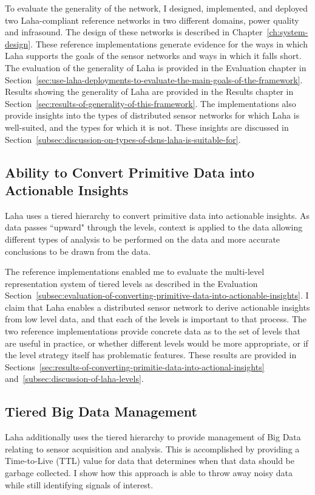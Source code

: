 To evaluate the generality of the network, I designed, implemented, and deployed two Laha-compliant reference networks in two different domains, power quality and infrasound. The design of these networks is described in Chapter~\ref{ch:system-design}. These reference implementations generate evidence for the ways in which Laha supports the goals of the sensor networks and ways in which it falls short. The evaluation of the generality of Laha is provided in the Evaluation chapter in Section~\ref{sec:use-laha-deployments-to-evaluate-the-main-goals-of-the-framework}. Results showing the generality of Laha are provided in the Results chapter in Section~\ref{sec:results-of-generality-of-this-framework}. The implementations also provide insights into the types of distributed sensor networks for which Laha is well-suited, and the types for which it is not. These insights are discussed in Section~\ref{subsec:discussion-on-types-of-dsns-laha-is-suitable-for}.

\subsection{Ability to Convert Primitive Data into Actionable Insights}\label{subsec:ability-to-convert-primitive-data-into-actional-insights}
Laha uses a tiered hierarchy to convert primitive data into actionable insights. As data passes ``upward" through the levels, context is applied to the data allowing different types of analysis to be performed on the data and more accurate conclusions to be drawn from the data.

The reference implementations enabled me to evaluate the multi-level representation system of tiered levels as described in the Evaluation Section~\ref{subsec:evaluation-of-converting-primitive-data-into-actionable-insights}. I claim that Laha enables a distributed sensor network to derive actionable insights from low level data, and that each of the levels is important to that process. The two reference implementations provide concrete data as to the set of levels that are useful in practice, or whether different levels would be more appropriate, or if the level strategy itself has problematic features. These results are provided in Sections~\ref{sec:results-of-converting-primitie-data-into-actional-insights} and~\ref{subsec:discussion-of-laha-levels}.

\subsection{Tiered Big Data Management}\label{subsec:tiered-big-data-management}
Laha additionally uses the tiered hierarchy to provide management of Big Data relating to sensor acquisition and analysis. This is accomplished by providing a Time-to-Live (TTL) value for data that determines when that data should be garbage collected. I show how this approach is able to throw away noisy data while still identifying signals of interest.

